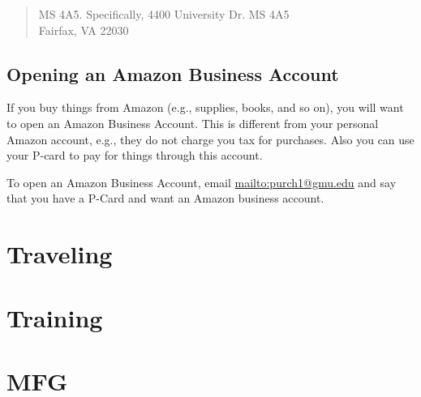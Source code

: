\documentclass[oneside,11pt,dvipsnames]{book}
\begin{document}
\begin{quote}
MS 4A5.  Specifically,  4400 University Dr. MS 4A5\\
Fairfax, VA 22030
\end{quote}


\section{Opening an Amazon Business Account}
If you buy things from Amazon (e.g., supplies, books, and so on), you will want to open an Amazon Business Account. This is different from your personal Amazon account, e.g., they do not charge you tax for purchases. Also you can use your P-card to pay for things through this account.  

To open an Amazon Business Account, email \url{mailto:purch1@gmu.edu} and say that you have a P-Card and want an Amazon business account.



\chapter{Traveling}
\chapter{Training}

\chapter{MFG}
\end{document}
